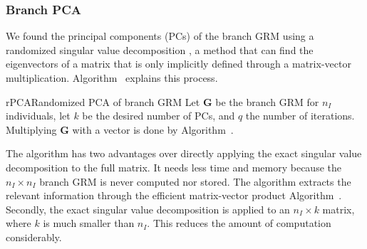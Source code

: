 
\subsubsection{Branch PCA}

We found the principal components (PCs) of the branch GRM
using a randomized singular value decomposition \citep{halko2011findingstructure},
a method that can find the
eigenvectors of a matrix that is only implicitly defined through a matrix-vector multiplication.
Algorithm~ explains this process.

\begin{taocpalg}{rPCA}{Randomized PCA of branch GRM}
{
    Let $\mathbf{G}$ be the branch GRM for $n_I$ individuals,
    let $k$ be the desired number of PCs, and $q$ the number of iterations.
    Multiplying $\mathbf{G}$ with a vector is done by Algorithm~.
}



The algorithm has two advantages over directly applying the exact singular value decomposition to the full matrix.
%
It needs less time and memory because the $n_I \times n_I$ branch GRM is never computed nor stored.
%
The algorithm extracts the relevant information through
the efficient matrix-vector product Algorithm~.
%
Secondly, the exact singular value decomposition is applied to an $n_I \times k$ matrix,
where $k$ is much smaller than $n_I$.
%
This reduces the amount of computation considerably.

\end{taocpalg}


